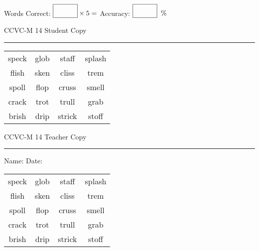 \documentclass{memoir}
\begin{document}
\small

Words Correct: $\fbox{\phantom{\huge 100}} \times 5 = $ Accuracy: $\fbox{\phantom{\huge 100}}\;\; \%$ 

\vfill

\newpage


\footnotesize \noindent
CCVC-M 14 \hfill Student Copy
\smallskip
\hrule

\Large

\setlength{\tabcolsep}{14pt}
\def\arraystretch{3}

{\selectfont


\begin{vplace}[0.5]
\begin{center}
\begin{tabular}{cccc}
speck & glob & staff            & splash \\
flish             & sken & cliss             & trem \\
spoll & flop & cruss & smell \\
crack       & trot & trull & grab                    \\
brish & drip & strick & stoff \\
\end{tabular}
\end{center}
\end{vplace}

}

\newpage

\footnotesize \noindent
CCVC-M 14 \hfill Teacher Copy
\smallskip
\hrule

\small

\vfill

\noindent
Name: \underline{\hspace{1.75in}} \hfill Date: \underline{\hspace{1in}}

\Large

{\selectfont


\begin{vplace}[0.5]
\begin{center}
\begin{tabular}{cccc}
speck & glob & staff            & splash \\
flish             & sken & cliss             & trem \\
spoll & flop & cruss & smell \\
crack       & trot & trull & grab                    \\
brish & drip & strick & stoff \\
\end{tabular}
\end{center}
\end{vplace}



}
\end{document}
